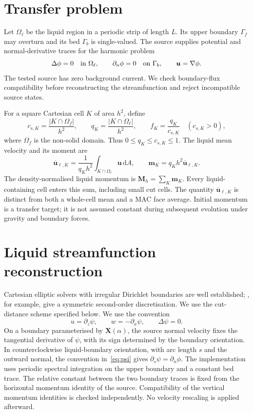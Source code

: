 \documentclass[10pt]{article}
\newcommand{\dd}{\,\mathrm{d}}
\begin{document}
\section{Transfer problem}
Let $\Omega_\ell$ be the liquid region in a periodic strip of length $L$.
Its upper boundary $\Gamma_f$ may overturn and its bed $\Gamma_b$ is
single-valued. The source supplies potential and normal-derivative traces
for the harmonic problem
\begin{equation}
 \Delta\phi=0\quad\hbox{in }\Omega_\ell,\qquad
 \partial_n\phi=0\quad\hbox{on }\Gamma_b,\qquad
 \boldsymbol u=\nabla\phi.
\end{equation}
The tested source has zero background current. We check boundary-flux
compatibility before reconstructing the streamfunction and reject
incompatible source states.

For a square Cartesian cell $K$ of area $h^2$, define
\begin{equation}
 c_{s,K}=\frac{|K\cap\Omega_f|}{h^2},\qquad
 q_K=\frac{|K\cap\Omega_\ell|}{h^2},\qquad
 f_K=\frac{q_K}{c_{s,K}}\quad(c_{s,K}>0),
 \label{eq:fractions}
\end{equation}
where $\Omega_f$ is the non-solid domain. Thus $0\le q_K\le c_{s,K}\le1$.
The liquid mean velocity and its moment are
\begin{equation}
 \overline{\boldsymbol u}_{\ell,K}
   =\frac{1}{q_Kh^2}\int_{K\cap\Omega_\ell}\boldsymbol u\dd A,
 \qquad \boldsymbol m_K=q_Kh^2\overline{\boldsymbol u}_{\ell,K}.
 \label{eq:means}
\end{equation}
The density-normalised liquid momentum is $\boldsymbol M_h=\sum_K\boldsymbol m_K$.
Every liquid-containing cell enters this sum, including small cut cells.
The quantity $\overline{\boldsymbol u}_{\ell,K}$ is distinct from both a
whole-cell mean and a MAC face average. Initial momentum is a transfer target;
it is not assumed constant during subsequent evolution under gravity and
boundary forces.

\section{Liquid streamfunction reconstruction}
Cartesian elliptic solvers with irregular Dirichlet boundaries are well
established; \citet{gibou}, for example, give a symmetric second-order
discretisation. We use the cut-distance scheme specified below.
We use the convention
\begin{equation}
 u=\partial_z\psi,\qquad w=-\partial_x\psi,\qquad \Delta\psi=0.
 \label{eq:psi}
\end{equation}
On a boundary parameterised by $\boldsymbol X(\alpha)$, the source normal
velocity fixes the tangential derivative of $\psi$, with its sign determined
by the boundary orientation. In counterclockwise liquid-boundary orientation,
with arc length $s$ and the outward normal, the convention in~\eqref{eq:psi}
gives $\partial_s\psi=\partial_n\phi$. The implementation uses periodic spectral
integration on the upper boundary and a constant bed trace. The relative
constant between the two boundary traces is fixed from the horizontal
momentum identity of the source. Compatibility of the vertical momentum
identities is checked independently. No velocity rescaling is applied afterward.
\end{document}
